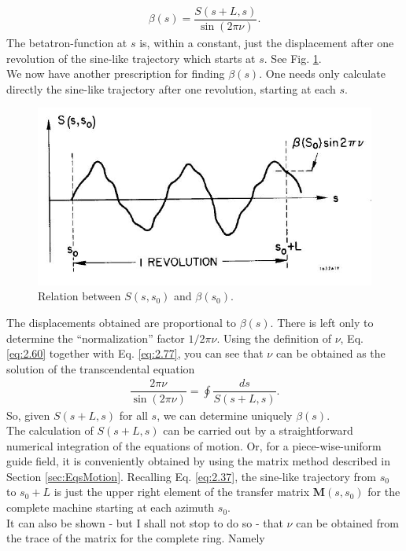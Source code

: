 \begin{align}\label{eq:2.77}
	\beta(s)=\dfrac{S(s+L,s)}{\sin{(2\pi\nu)}}.
\end{align}
The betatron-function at $s$ is, within a constant, just the displacement after one revolution
 of the sine-like trajectory which starts at $s$. See Fig. \ref{fig:fig19}.\\
We now have another prescription for finding $\beta(s)$. One needs only calculate directly the sine-like trajectory after one revolution, starting at each $s$.\\
\begin{figure}[!htb]
	\centering
	\includegraphics[width=0.8\linewidth]{./Figuras/fig19.jpeg}
	\caption{Relation between $S(s, s_0)$ and $\beta(s_0)$.}
	\label{fig:fig19}
\end{figure}
The displacements obtained are proportional to $\beta(s)$. There is left only to determine the ``normalization'' factor $1/2\pi\nu$. Using the definition of $\nu$, Eq. \eqref{eq:2.60} together with Eq. \eqref{eq:2.77}, you can see that $\nu$ can be obtained as the solution of the transcendental equation
\begin{align}
	\dfrac{2\pi\nu}{\sin{(2\pi\nu)}}=\oint\dfrac{ds}{S(s+L,s)}.
\end{align}
So, given $S(s+L, s)$ for all $s$, we can determine uniquely $\beta(s)$.\\
The calculation of $S(s +L, s)$ can be carried out by a straightforward numerical integration
 of the equations of motion. Or, for a piece-wise-uniform guide field, it is conveniently obtained by using the matrix method described in Section \ref{sec:EqsMotion}. Recalling Eq. \eqref{eq:2.37}, the sine-like trajectory from $s_0$ to $s_0 + L$ is just the upper right element of the transfer matrix $\bm{M}(s, s_0)$ for the complete machine starting at each azimuth $s_0$.\\
It can also be shown - but I shall not stop to do so - that $\nu$ can be obtained from the trace of the matrix for the complete ring. Namely
